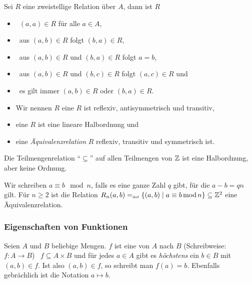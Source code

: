 \begin{definition}
Sei $R$ eine zweistellige Relation über $A$, dann ist $R$
\begin{itemize}
%
\item {} \gdw \ $(a,a) \in R$ für alle $a \in A$,
%
\item {} \gdw \ aus $(a,b) \in R$ folgt $(b,a) \in R$,
%
\item {} \gdw \ aus $(a,b) \in R$ und $(b,a) \in R$ folgt $a =
b$,
%
\item {} \gdw \ aus $(a,b) \in R$ und $(b,c) \in R$ folgt $(a,c)
\in R$ und 
%
\item {} \gdw \ es gilt immer $(a,b) \in R$ oder $(b, a) \in R$.
%
\item Wir nennen $R$ eine  \gdw $R$ ist reflexiv,
antisymmetrisch und transitiv,
%
\item eine  \gdw $R$ ist eine lineare Halbordnung und
%
\item eine \emph{Äquivalenzrelation} 
\gdw $R$ reflexiv, transitiv und symmetrisch ist.
%
\end{itemize}
\end{definition}

\begin{example}
Die Teilmengenrelation "`$\subseteq$"' auf allen Teilmengen von $\mathbb Z$ ist
eine Halbordnung, aber keine Ordnung. 
\end{example}
\goodbreak

\begin{example}
Wir schreiben $a \equiv b \mod
n$, falls es eine ganze Zahl $q$ gibt, für die $a - b = q n$ gilt. Für $n \ge 2$
ist die Relation $R_n(a,b) =_{\mathrm{\scriptscriptstyle def}} \{(a,b) \mid a \equiv b \mathrm{\,mod\,} n\} \subseteq
\mathbb Z^2$ eine Äquivalenzrelation.
\end{example}

\subsubsection{Eigenschaften von Funktionen}
\label{PropFunc}
Seien $A$ und $B$ beliebige Mengen. $f$ ist eine  von $A$ nach
$B$ (Schreibweise: $f \colon A \rightarrow B$) \gdw \ $f \subseteq A \times
B$ und für jedes $a \in A$ gibt es \emph{höchstens} ein $b \in B$ mit
$(a, b) \in f$. Ist also $(a,b) \in f$, so schreibt man $f(a) =
b$. Ebenfalls gebrächlich ist die Notation $a \mapsto b$.

